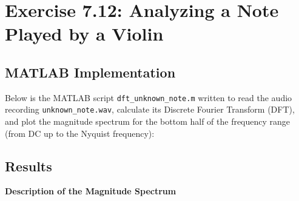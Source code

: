 \section{Exercise 7.12: Analyzing a Note Played by a Violin} 


\subsection{MATLAB Implementation}

Below is the MATLAB script \texttt{dft\_unknown\_note.m} written to read the audio recording \texttt{unknown\_note.wav}, calculate its Discrete Fourier Transform (DFT), and plot the magnitude spectrum for the bottom half of the frequency range (from DC up to the Nyquist frequency):



\subsection{Results}

\textbf{Description of the Magnitude Spectrum}

